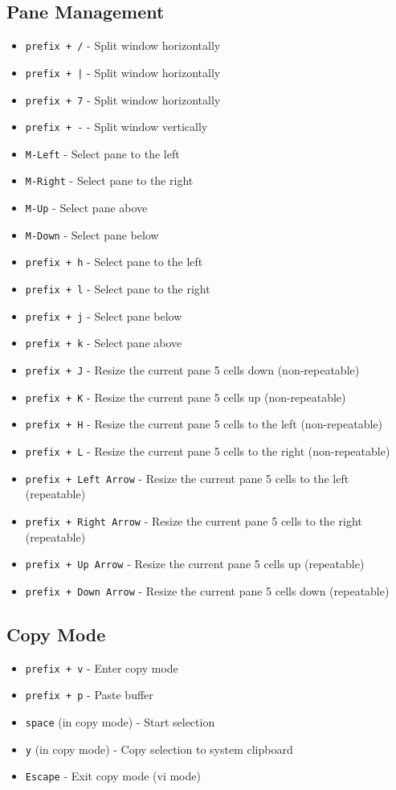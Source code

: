 \documentclass{article}
\begin{document}
\subsection{Pane Management}
\begin{itemize}
  \item \texttt{prefix + /} - Split window horizontally
  \item \texttt{prefix + |} - Split window horizontally
  \item \texttt{prefix + 7} - Split window horizontally
  \item \texttt{prefix + -} - Split window vertically
  \item \texttt{M-Left} - Select pane to the left
  \item \texttt{M-Right} - Select pane to the right
  \item \texttt{M-Up} - Select pane above
  \item \texttt{M-Down} - Select pane below
  \item \texttt{prefix + h} - Select pane to the left
  \item \texttt{prefix + l} - Select pane to the right
  \item \texttt{prefix + j} - Select pane below
  \item \texttt{prefix + k} - Select pane above
  \item \texttt{prefix + J} - Resize the current pane 5 cells down (non-repeatable)
  \item \texttt{prefix + K} - Resize the current pane 5 cells up (non-repeatable)
  \item \texttt{prefix + H} - Resize the current pane 5 cells to the left (non-repeatable)
  \item \texttt{prefix + L} - Resize the current pane 5 cells to the right (non-repeatable)
  \item \texttt{prefix + Left Arrow} - Resize the current pane 5 cells to the left (repeatable)
  \item \texttt{prefix + Right Arrow} - Resize the current pane 5 cells to the right (repeatable)
  \item \texttt{prefix + Up Arrow} - Resize the current pane 5 cells up (repeatable)
  \item \texttt{prefix + Down Arrow} - Resize the current pane 5 cells down (repeatable)
\end{itemize}

\subsection{Copy Mode}
\begin{itemize}
  \item \texttt{prefix + v} - Enter copy mode
  \item \texttt{prefix + p} - Paste buffer
  \item \texttt{space} (in copy mode) - Start selection
  \item \texttt{y} (in copy mode) - Copy selection to system clipboard
  \item \texttt{Escape} - Exit copy mode (vi mode)
\end{itemize}
\end{document}
